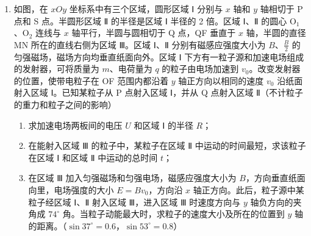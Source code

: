 \documentclass[\gkver]{gaokaozhenti}
\begin{document}
\begin{enumerate}
\item
如图，在 $xOy$ 坐标系中有三个区域，圆形区域 Ⅰ 分别与 $x$ 轴和 $y$ 轴相切于 P 点和 S 点。半圆形区域 Ⅱ 的半径是区域 Ⅰ 半径的 2 倍。区域 Ⅰ、Ⅱ 的圆心 O$_{1}$、O$_{2}$ 连线与 $x$ 轴平行，半圆与圆相切于 Q 点，QF 垂直于 $x$ 轴，半圆的直径 MN 所在的直线右侧为区域 Ⅲ。区域 Ⅰ、Ⅱ 分别有磁感应强度大小为 $B$、$\frac{B}{2}$ 的匀强磁场，磁场方向均垂直纸面向外。区域 Ⅰ 下方有一粒子源和加速电场组成的发射器，可将质量为 $m$、电荷量为 $q$ 的粒子由电场加速到 $v_{0}$。改变发射器的位置，使带电粒子在 OF 范围内都沿着 $y$ 轴正方向以相同的速度 $v_{0}$ 沿纸面射入区域 Ⅰ。已知某粒子从 P 点射入区域 Ⅰ，并从 Q 点射入区域 Ⅱ（不计粒子的重力和粒子之间的影响）
\begin{enumerate}
	\item
	求加速电场两板间的电压 $U$ 和区域 Ⅰ 的半径 $R$；
	\item
	在能射入区域 Ⅲ 的粒子中，某粒子在区域 Ⅱ 中运动的时间最短，求该粒子在区域 Ⅰ 和区域 Ⅱ 中运动的总时间 $t$；
	\item
	在区域 Ⅲ 加入匀强磁场和匀强电场，磁感应强度大小为 $B$，方向垂直纸面向里，电场强度的大小 $E = Bv_{0}$，方向沿 $x$ 轴正方向。此后，粒子源中某粒子经区域 Ⅰ、Ⅱ 射入区域 Ⅲ，进入区域 Ⅲ 时速度方向与 $y$ 轴负方向的夹角成 $74^\circ$ 角。当粒子动能最大时，求粒子的速度大小及所在的位置到 $y$ 轴的距离。（$\sin37^\circ = 0.6$，$\sin53^\circ = 0.8$）
\end{enumerate}
\end{enumerate}
\end{document}
